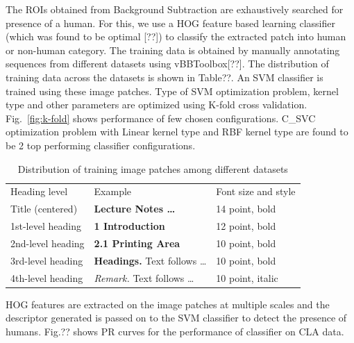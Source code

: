 \documentclass[runningheads]{llncs}
\begin{document}
The ROIs obtained from Background Subtraction are exhaustively searched for presence of a human. For this, we use a HOG feature based learning classifier (which was found to be optimal [??]) to classify the extracted patch into human or non-human category. The training data is obtained by manually annotating sequences from different datasets using vBBToolbox[??]. The distribution of training data across the datasets is shown in Table??. An SVM classifier is trained using these image patches. Type of SVM optimization problem, kernel type and other parameters are optimized using K-fold cross validation. Fig.~\ref{fig:k-fold} shows performance of few chosen configurations. C\_SVC optimization problem with Linear kernel type and RBF kernel type are found to be 2 top performing classifier configurations. 

\begin{table}
\begin{center}
\label{table:headings}
\begin{tabular}{lll}
\hline\noalign{\smallskip}
Heading level & Example & Font size and style\\
\noalign{\smallskip}
\hline
\noalign{\smallskip}
Title (centered)  & {\Large \bf Lecture Notes \dots} & 14 point, bold\\
1st-level heading & {\large \bf 1 Introduction} & 12 point, bold\\
2nd-level heading & {\bf 2.1 Printing Area} & 10 point, bold\\
3rd-level heading & {\bf Headings.} Text follows \dots & 10 point, bold
\\
4th-level heading & {\it Remark.} Text follows \dots & 10 point,
italic\\
\hline
\end{tabular}
\end{center}
\caption{Distribution of training image patches among different datasets}
\end{table}

HOG features are extracted on the image patches at multiple scales and the descriptor generated is passed on to the SVM classifier to detect the presence of humans. Fig.?? shows PR curves for the performance of classifier on CLA data.
\end{document}
